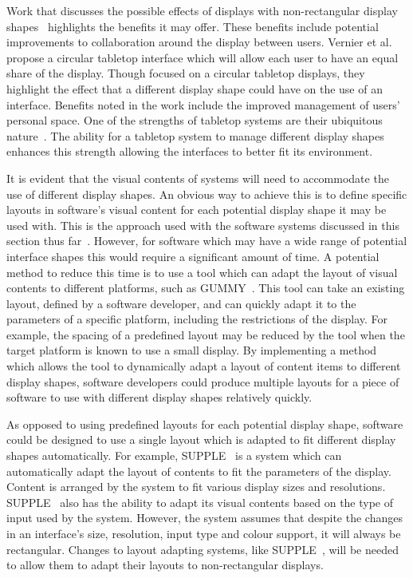 \documentclass[review,5p,times,twocolumn]{elsarticle}
\begin{document}
Work that discusses the possible effects of displays with non-rectangular display shapes~\cite{Vernier2002} highlights the benefits it may offer.
These benefits include potential improvements to collaboration around the display between users.
Vernier et al.~\cite{Vernier2002} propose a circular tabletop interface which will allow each user to have an equal share of the display.
Though focused on a circular tabletop displays, they highlight the effect that a different display shape could have on the use of an interface.
Benefits noted in the work include the improved management of users' personal space.
One of the strengths of tabletop systems are their ubiquitous nature~\cite{Smith2012}.
The ability for a tabletop system to manage different display shapes enhances this strength allowing the interfaces to better fit its environment.

It is evident that the visual contents of systems will need to accommodate the use of different display shapes.
An obvious way to achieve this is to define specific layouts in software's visual content for each potential display shape it may be used with.
This is the approach used with the software systems discussed in this section thus far~\cite{Hansen2009,Shen2004}.
However, for software which may have a wide range of potential interface shapes this would require a significant amount of time.
A potential method to reduce this time is to use a tool which can adapt the layout of visual contents to different platforms, such as GUMMY~\cite{Meskens2008}.
This tool can take an existing layout, defined by a software developer, and can quickly adapt it to the parameters of a specific platform, including the restrictions of the display.
For example, the spacing of a predefined layout may be reduced by the tool when the target platform is known to use a small display.
By implementing a method which allows the tool to dynamically adapt a layout of content items to different display shapes, software developers could produce multiple layouts for a piece of software to use with different display shapes relatively quickly.

As opposed to using predefined layouts for each potential display shape, software could be designed to use a single layout which is adapted to fit different display shapes automatically.
For example, SUPPLE~\cite{Gajos2004} is a system which can automatically adapt the layout of contents to fit the parameters of the display.
Content is arranged by the system to fit various display sizes and resolutions.
SUPPLE~\cite{Gajos2004} also has the ability to adapt its visual contents based on the type of input used by the system.
However, the system assumes that despite the changes in an interface's size, resolution, input type and colour support, it will always be rectangular.
Changes to layout adapting systems, like SUPPLE~\cite{Gajos2004}, will be needed to allow them to adapt their layouts to non-rectangular displays.
\end{document}
